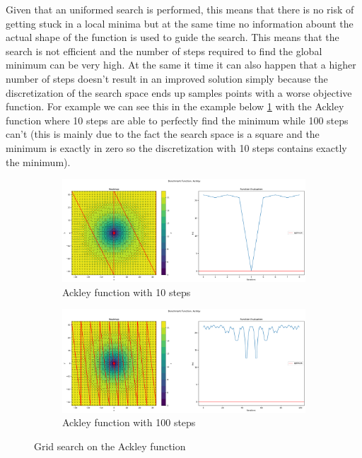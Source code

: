Given that an uniformed search is performed, this means that there is no risk of getting stuck in a local minima but at the same time no information abount the actual shape of the function is used to guide the search. This means that the search is not efficient and the number of steps required to find the global minimum can be very high. At the same it time it can also happen that a higher number of steps doesn't result in an improved solution simply because the discretization of the search space ends up samples points with a worse objective function. For example we can see this in the example below \ref{fig:gs-ackley} with the Ackley function where 10 steps are able to perfectly find the minimum while 100 steps can't (this is mainly due to the fact the search space is a square and the minimum is exactly in zero so the discretization with 10 steps contains exactly the minimum).

\begin{figure}[H]
    \begin{subfigure}{0.5\textwidth}
        \includegraphics[width=\textwidth]{lab1/imgs/gs_ackley_10.png}
        \caption{Ackley function with 10 steps}
    \end{subfigure}
    \begin{subfigure}{0.5\textwidth}
        \includegraphics[width=\textwidth]{lab1/imgs/gs_ackley_100.png}
        \caption{Ackley function with 100 steps}
    \end{subfigure}
    \caption{Grid search on the Ackley function}
    \label{fig:gs-ackley}
\end{figure}


